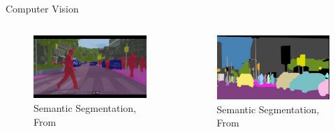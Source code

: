 \documentclass[10pt]{beamer}
\begin{document}
\begin{frame}{Computer Vision}
	\begin{columns}
		\begin{column}{0.5\textwidth}
			\begin{figure}
				\caption{Semantic Segmentation, {From \href{https://heartbeat.fritz.ai/the-5-computer-vision-techniques-that-will-change-how-you-see-the-world-1ee19334354b}{}}}
				\includegraphics[width=1.0\textwidth, center, trim=0cm 0cm 0 0cm]{images/semantic_seg.jpeg}
			\end{figure}
		\end{column}
		\begin{column}{0.5\textwidth}
			\begin{figure}
				\caption{Semantic Segmentation, {From \href{https://heartbeat.fritz.ai/the-5-computer-vision-techniques-that-will-change-how-you-see-the-world-1ee19334354b}{}}}
				\includegraphics[width=1.0\textwidth, center, trim=0cm 0cm 0 0cm]{images/int_seg.jpeg}
			\end{figure}
		\end{column}
	\end{columns}
\end{frame}
\end{document}
